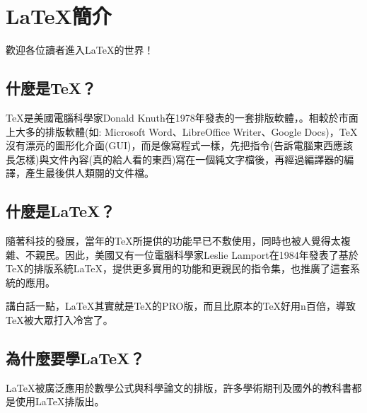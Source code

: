 \documentclass[12pt, a4paper, oneside]{extbook}
\let\tmpTeX\TeX
\renewcommand{\TeX}{\textrm{\tmpTeX}}
\let\tmpLaTeX\LaTeX
\renewcommand{\LaTeX}{\textrm{\tmpLaTeX}}
\begin{document}
	
	
	
	\chapter{\LaTeX 簡介}
		歡迎各位讀者進入\LaTeX 的世界！
		
		

	\section{什麼是\TeX ？}
		\TeX 是美國電腦科學家Donald Knuth在1978年發表的一套排版軟體，。相較於市面上大多的排版軟體(如: Microsoft Word、LibreOffice Writer、Google Docs)，\TeX 沒有漂亮的圖形化介面(GUI)，而是像寫程式一樣，先把指令(告訴電腦東西應該長怎樣)與文件內容(真的給人看的東西)寫在一個純文字檔後，再經過編譯器的編譯，產生最後供人類閱的文件檔。
	\section{什麼是\LaTeX ？}
		隨著科技的發展，當年的\TeX 所提供的功能早已不敷使用，同時也被人覺得太複雜、不親民。因此，美國又有一位電腦科學家Leslie Lamport在1984年發表了基於\TeX 的排版系統\LaTeX ，提供更多實用的功能和更親民的指令集，也推廣了這套系統的應用。
		
		講白話一點，\LaTeX 其實就是\TeX 的PRO版，而且比原本的\TeX 好用n百倍，導致\TeX 被大眾打入冷宮了。

	\section{為什麼要學\LaTeX ？}
		\LaTeX 被廣泛應用於數學公式與科學論文的排版，許多學術期刊及國外的教科書都是使用\LaTeX 排版出。
\end{document}
